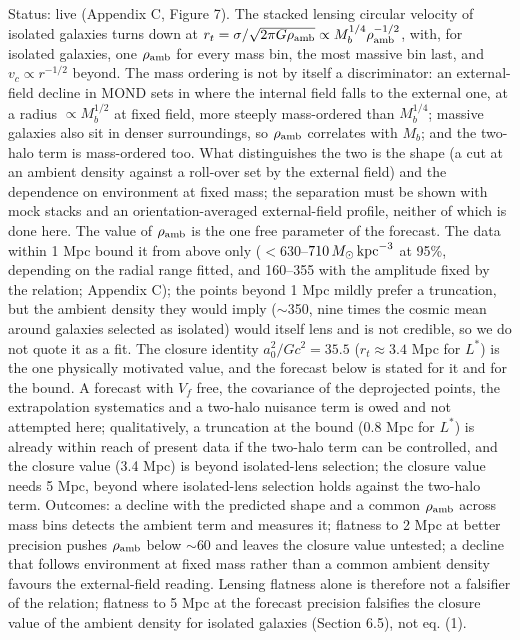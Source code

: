 \documentclass[
  10pt,
]{article}
\begin{document}
Status: live (Appendix C, Figure 7). The stacked
lensing circular velocity of isolated galaxies turns down at
$r_t=\sigma/\sqrt{2\pi G\rho_{\rm amb}}\propto M_b^{1/4}\rho_{\rm amb}^{-1/2}$, with, for isolated galaxies, one $\rho_{\rm amb}$ for every mass bin, the most massive bin last, and
$v_c\propto r^{-1/2}$ beyond. The mass ordering is not by itself a discriminator: an external-field decline in MOND sets in where the internal field falls to the external one, at a radius $\propto M_b^{1/2}$ at fixed field, more steeply mass-ordered than $M_b^{1/4}$; massive galaxies also sit in denser surroundings, so $\rho_{\rm amb}$ correlates with $M_b$; and the two-halo term is mass-ordered too. What distinguishes the two is the shape (a cut at an ambient density against a roll-over set by the external field) and the dependence on environment at fixed mass; the separation must be shown with mock stacks and an orientation-averaged external-field profile, neither of which is done here.
The value of $\rho_{\rm amb}$ is the one free parameter of the forecast. The data within 1 Mpc bound it from above only ($<630$--$710\,M_\odot\,{\rm kpc}^{-3}$ at 95\%, depending on the radial range fitted, and 160--355 with the amplitude fixed by the relation; Appendix C); the points beyond 1 Mpc mildly prefer a truncation, but the ambient density they would imply ($\sim$350, nine times the cosmic mean around galaxies selected as isolated) would itself lens and is not credible, so we do not quote it as a fit. The closure identity $a_0^2/Gc^2=35.5$ ($r_t\approx3.4$ Mpc for $L^*$) is the one physically motivated value, and the forecast below is stated for it and for the bound.
A forecast with $V_f$ free, the covariance of the deprojected points, the extrapolation systematics and a two-halo nuisance term is owed and not attempted here; qualitatively, a truncation at the bound (0.8 Mpc for $L^*$) is already within reach of present data if the two-halo term can be controlled, and the closure value (3.4 Mpc) is beyond isolated-lens selection; the closure value needs 5 Mpc, beyond where
isolated-lens selection holds against the two-halo term. Outcomes: a decline with the predicted shape and a common $\rho_{\rm amb}$ across mass bins detects the ambient term and measures it; flatness to 2 Mpc at better precision pushes $\rho_{\rm amb}$ below $\sim$60 and leaves the closure value untested; a decline that follows environment at fixed mass rather than a common ambient density favours the external-field reading. Lensing flatness alone is therefore not a falsifier of the relation; flatness to 5 Mpc at the forecast precision falsifies the closure value of the ambient density for isolated galaxies (Section 6.5), not eq. (1).
\end{document}
